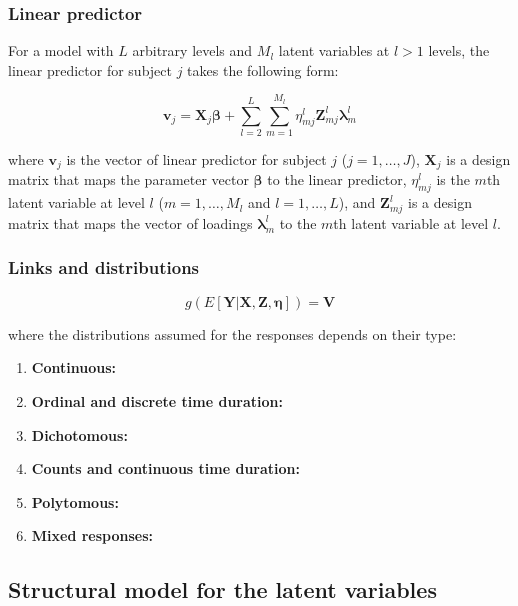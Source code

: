\subsubsection{Linear predictor}

For a model with $L$ arbitrary levels and $M_{l}$ latent variables at $l>1$ levels, the linear predictor for subject $j$ takes the following form:

\begin{equation}
	\mathbf{v}_{j} = \mathbf{X}_{j} \pmb{\beta} + \sum_{l=2}^{L} \sum_{m=1}^{M_{l}} \eta_{mj}^{l} \mathbf{Z}_{mj}^{l} \pmb{\lambda}_{m}^{l}
\end{equation}

\noindent where $\mathbf{v}_{j}$ is the vector of linear predictor for subject $j$ ($j=1, \dots, J$), $\mathbf{X}_{j}$ is a design matrix that maps the parameter vector $\pmb{\beta}$ to the linear predictor, $\eta_{mj}^{l}$ is the $m$th latent variable at level $l$ ($m=1, \dots, M_{l}$ and $l=1, \dots, L$), and $\mathbf{Z}_{mj}^{l}$ is a design matrix that maps the vector of loadings $\pmb{\lambda}_{m}^{l}$ to the $m$th latent variable at level $l$.

\subsubsection{Links and distributions}

\begin{equation}
	g(E[\mathbf{Y} | \mathbf{X}, \mathbf{Z}, \pmb{\eta}]) = \mathbf{V}
\end{equation}

\noindent where the distributions assumed for the responses depends on their type:
\begin{enumerate}
	\item \textbf{Continuous:}
	\item \textbf{Ordinal and discrete time duration:}
	\item \textbf{Dichotomous:}
	\item \textbf{Counts and continuous time duration:}
	\item \textbf{Polytomous:}
	\item \textbf{Mixed responses:}
\end{enumerate}

\subsection{Structural model for the latent variables}

